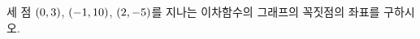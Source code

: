 세 점 $(0{,}\mkern3mu\mathopen{}3)$, $(-1{,}\mkern3mu\mathopen{}10)$, $(2{,}\mkern3mu\mathopen{}-5)$를 지나는 이차함수의 그래프의 꼭짓점의 좌표를 구하시오.
